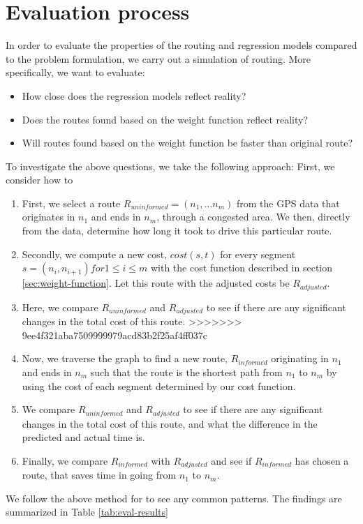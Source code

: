 \section{Evaluation process}
In order to evaluate the properties of the routing and regression models compared to the problem formulation, we carry out a simulation of routing. More specifically, we want to evaluate:
\begin{itemize}
\item How close does the regression models reflect reality?
\item Does the routes found based on the weight function reflect reality?
\item Will routes found based on the weight function be faster than original route?
\end{itemize}
To investigate the above questions, we take the following approach:
First, we consider how to
\begin{enumerate}
\item First, we select a route $R_{uninformed}=(n_1,...n_m)$ from the GPS data that originates in $n_1$ and ends in $n_m$, through a congested area. We then, directly from the data, determine how long it took to drive this particular route.
\item Secondly, we compute a new cost, $cost(s, t)$ for every segment $s=(n_i,n_{i+1}) for 1 \leq i \leq m$ with the cost function described in section \ref{sec:weight-function}. Let this route with the adjusted costs be $R_{adjusted}$.
\item Here, we compare $R_{uninformed}$ and $R_{adjusted}$ to see if there are any significant changes in the total cost of this route.
>>>>>>> 9ee4f321aba7509999979acd83b2f25af4ff037c
\item Now, we traverse the graph to find a new route, $R_{informed}$ originating in $n_1$ and ends in $n_m$ such that the route is the shortest path from $n_1$ to $n_m$ by using the cost of each segment determined by our cost function.
\item We compare $R_{uninformed}$ and $R_{adjusted}$ to see if there are any significant changes in the total cost of this route, and what the difference in the predicted and actual time is.
\item Finally, we compare $R_{informed}$ with $R_{adjusted}$ and see if $R_{informed}$ has chosen a route, that saves time in going from $n_1$ to $n_m$.
\end{enumerate}
We follow the above method for  to see any common patterns. The findings are summarized in Table \ref{tab:eval-results}
